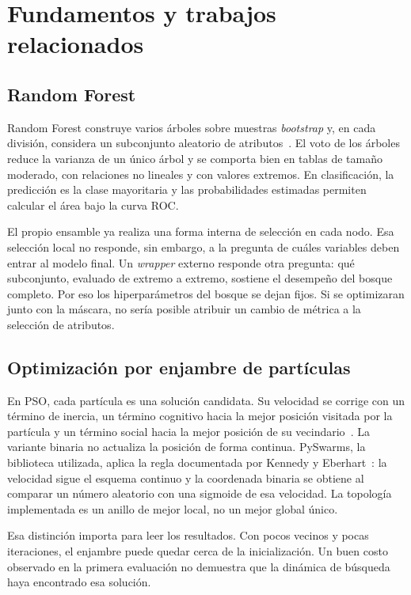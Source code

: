 \documentclass[conference]{IEEEtran}
\begin{document}
\section{Fundamentos y trabajos relacionados}

\subsection{Random Forest}
Random Forest construye varios árboles sobre muestras \emph{bootstrap} y, en cada división, considera un subconjunto aleatorio de atributos~\cite{breiman2001}. El voto de los árboles reduce la varianza de un único árbol y se comporta bien en tablas de tamaño moderado, con relaciones no lineales y con valores extremos. En clasificación, la predicción es la clase mayoritaria y las probabilidades estimadas permiten calcular el área bajo la curva ROC.

El propio ensamble ya realiza una forma interna de selección en cada nodo. Esa selección local no responde, sin embargo, a la pregunta de cuáles variables deben entrar al modelo final. Un \emph{wrapper} externo responde otra pregunta: qué subconjunto, evaluado de extremo a extremo, sostiene el desempeño del bosque completo. Por eso los hiperparámetros del bosque se dejan fijos. Si se optimizaran junto con la máscara, no sería posible atribuir un cambio de métrica a la selección de atributos.

\subsection{Optimización por enjambre de partículas}
En PSO, cada partícula es una solución candidata. Su velocidad se corrige con un término de inercia, un término cognitivo hacia la mejor posición visitada por la partícula y un término social hacia la mejor posición de su vecindario~\cite{kennedy1995}. La variante binaria no actualiza la posición de forma continua. PySwarms, la biblioteca utilizada, aplica la regla documentada por Kennedy y Eberhart~\cite{kennedy1997,miranda2018}: la velocidad sigue el esquema continuo y la coordenada binaria se obtiene al comparar un número aleatorio con una sigmoide de esa velocidad. La topología implementada es un anillo de mejor local, no un mejor global único.

Esa distinción importa para leer los resultados. Con pocos vecinos y pocas iteraciones, el enjambre puede quedar cerca de la inicialización. Un buen costo observado en la primera evaluación no demuestra que la dinámica de búsqueda haya encontrado esa solución.
\end{document}
